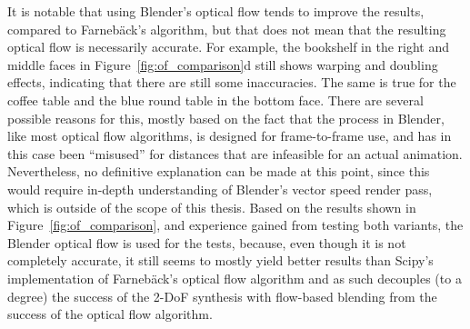 
It is notable that using Blender's optical flow tends to improve the results, compared to Farneb\"ack's algorithm, but that does not mean that the resulting optical flow is necessarily accurate. For example, the bookshelf in the right and middle faces in Figure~\ref{fig:of_comparison}d still shows warping and doubling effects, indicating that there are still some inaccuracies. The same is true for the coffee table and the blue round table in the bottom face. There are several possible reasons for this, mostly based on the fact that the process in Blender, like most optical flow algorithms, is designed for frame-to-frame use, and has in this case been ``misused'' for distances that are infeasible for an actual animation. Nevertheless, no definitive explanation can be made at this point, since this would require in-depth understanding of Blender's vector speed render pass, which is outside of the scope of this thesis. Based on the results shown in Figure~\ref{fig:of_comparison}, and experience gained from testing both variants, the Blender optical flow is used for the tests, because, even though it is not completely accurate, it still seems to mostly yield better results than Scipy's implementation of Farneb\"ack's optical flow algorithm and as such decouples (to a degree) the success of the 2-DoF synthesis with flow-based blending from the success of the optical flow algorithm.


